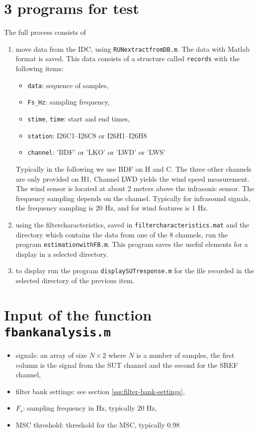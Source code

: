

\section{3 programs for test}
The full process consists of
\begin{enumerate}
\item
 move data from the IDC, using {\tt RUNextractfromDB.m}. The data with Matlab format is saved. This data consists of a structure called {\tt records} with the following items:
 \begin{itemize}
 \item
{\tt data}: sequence of samples,
 \item
{\tt Fs\_Hz}: sampling frequency,
\item
{\tt stime}, {\tt time}: start and end times, 
\item
{\tt station}: I26C1--I26C8 or I26H1--I26H8
\item
{\tt channel}: 'BDF' or 'LKO' or 'LWD' or 'LWS'
 \end{itemize}   
Typically in the following we use BDF on H and C.   The three other channels are only provided on H1. Channel LWD yields  the wind speed measurement. The wind sensor is located at about 2 meters above the infrasonic sensor. The frequency sampling depends on the channel. Typically for infrasound signals, the frequency sampling is $20$ Hz, and for wind features is 1 Hz.
    
\item
 using the filtercharacteristics, saved in {\tt filtercharacteristics.mat} and the directory which contains the data from one of the 8 channels, run the program {\tt estimationwithFB.m}. This program saves the useful elements for a display in a selected directory.
 \item
 to display run the program {\tt displaySUTresponse.m} for the file recorded in the selected directory of the previous item.
\end{enumerate}


\section{Input of the function {\tt fbankanalysis.m}}
\begin{itemize}
\item
signals: an array of size $N\times 2$ where $N$ is a number of samples, the first column is the signal from the SUT channel and the second for the SREF channel,
\item
filter bank settings: see section \ref{sss:filter-bank-settings},
\item
$F_s$: sampling frequency in Hz, typically $20$ Hz,
\item
MSC threshold: threshold for the MSC, typically $0.98$
\end{itemize}

